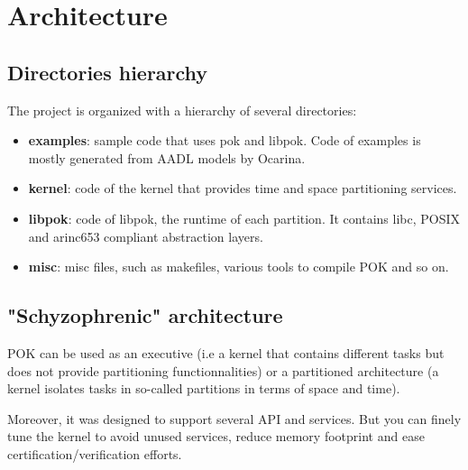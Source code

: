 %
%
%
%
%

\chapter{Architecture}
   \section{Directories hierarchy}
   The project is organized with a hierarchy of several directories:
   \begin{itemize}
      \item
         \textbf{examples}: sample code that uses pok and libpok. Code of
         examples is mostly generated from AADL models by Ocarina.

      \item
         \textbf{kernel}: code of the kernel that provides time and space
         partitioning services.

      \item
         \textbf{libpok}: code of libpok, the runtime of each partition. 
         It contains libc, POSIX and arinc653 compliant abstraction layers.

      \item
         \textbf{misc}: misc files, such as makefiles, various tools to 
         compile POK and so on.
   \end{itemize}

   \section{"Schyzophrenic" architecture}
   POK can be used as an executive (i.e a kernel that contains different tasks
   but does not provide partitioning functionnalities) or a partitioned
   architecture (a kernel isolates tasks in so-called partitions in terms
   of space and time).

   Moreover, it was designed to support several API and services. But you can
   finely tune the kernel to avoid unused services, reduce memory footprint and
   ease certification/verification efforts.

